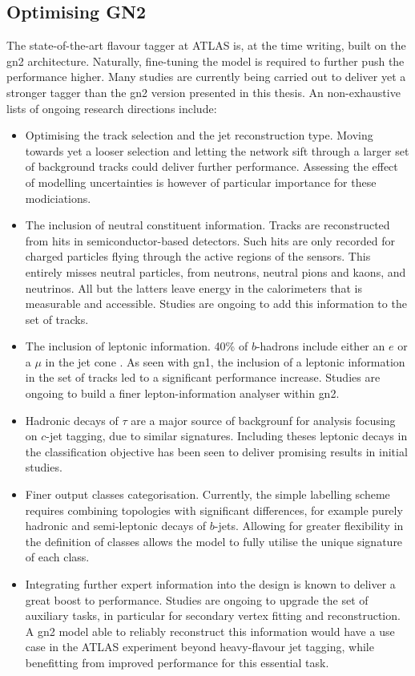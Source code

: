 
\subsection{Optimising GN2}\label{chap-GN2Opt}
The state-of-the-art flavour tagger at ATLAS is, at the time writing, built on the \gls{gn2} architecture. Naturally, fine-tuning the model is required to further push the performance higher. Many studies are currently being carried out to deliver yet a stronger tagger than the \gls{gn2} version presented in this thesis. An non-exhaustive lists of ongoing research directions include: 
\begin{itemize}
  \item Optimising the track selection and the jet reconstruction type. Moving towards yet a looser selection and letting the network sift through a larger set of background tracks could deliver further performance. Assessing the effect of modelling uncertainties is however of particular importance for these modiciations.
  \item The inclusion of neutral constituent information. Tracks are reconstructed from hits in semiconductor-based detectors. Such hits are only recorded for charged particles flying through the active regions of the sensors. This entirely misses neutral particles, from neutrons, neutral pions and kaons, and neutrinos. All but the latters leave energy in the calorimeters that is measurable and accessible. Studies are ongoing to add this information to the set of tracks. 
  \item The inclusion of leptonic information. 40\% of $b$-hadrons include either an $e$ or a $\mu$ in the jet cone \cite{Tanabashi:2018oca}. As seen with \gls{gn1}, the inclusion of a leptonic information in the set of tracks led to a significant performance increase. Studies are ongoing to build a finer lepton-information analyser within \gls{gn2}.
  \item Hadronic decays of $\tau$ are a major source of backgrounf for analysis focusing on $c$-jet tagging, due to similar signatures. Including theses leptonic decays in the classification objective has been seen to deliver promising results in initial studies. 
  \item Finer output classes categorisation. Currently, the simple labelling scheme requires combining topologies with significant differences, for example purely hadronic and semi-leptonic decays of $b$-jets. Allowing for greater flexibility in the definition of classes allows the model to fully utilise the unique signature of each class. 
  \item Integrating further expert information into the design is known to deliver a great boost to performance. Studies are ongoing to upgrade the set of auxiliary tasks, in particular for secondary vertex fitting and reconstruction. A \gls{gn2} model able to reliably reconstruct this information would have a use case in the ATLAS experiment beyond heavy-flavour jet tagging, while benefitting from improved performance for this essential task.  
\end{itemize}

